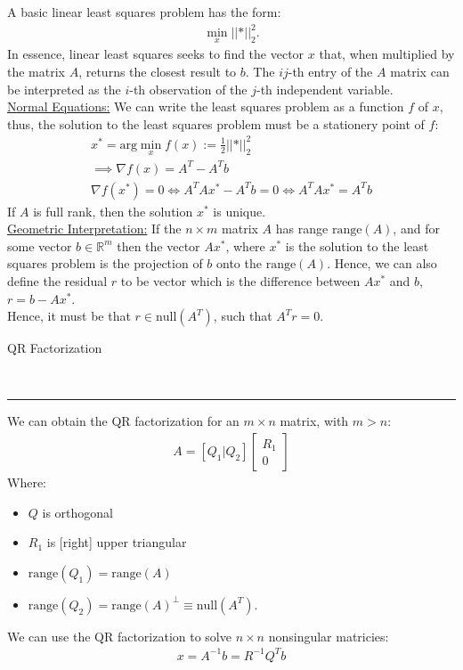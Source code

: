 \documentclass{article}
\newcommand{\header}[1]{\begin{large}\noindent #1\end{large}\\\rule{\textwidth}{0.5pt}}
\newcommand{\norm}[2]{\left\lvert\left\lvert#1\right\rvert\right\rvert}
\newcommand{\sheader}[1]{\underline{#1:}}
\newcommand{\gap}{\medskip\\}
\begin{document}
A basic linear least squares problem has the form:
\begin{align*}
    \min_x \norm*{Ax - b}^2_2.
\end{align*}
In essence, linear least squares seeks to find the vector $x$ that, when multiplied by 
the matrix $A$, returns the closest result to $b$. The $ij$-th entry of the $A$ matrix can be 
interpreted as the $i$-th observation of the $j$-th independent variable.
\gap
\sheader{Normal Equations}
We can write the least squares problem as a function $f$ of $x$, thus, the solution to the least 
squares problem must be a stationery point of $f$:
\begin{align*}
    x^* = \textrm{arg}\min_{x} f(x) := \frac{1}{2} \norm*{Ax-b}^2_2\\
    \implies \nabla f(x) = A^T - A^Tb\\
    \nabla f(x^*) = 0 \iff A^TAx^* - A^Tb = 0 \iff A^TAx^* = A^Tb
\end{align*}
If $A$ is full rank, then the solution $x^*$ is unique.
\gap
\sheader{Geometric Interpretation}
If the $n \times m$ matrix $A$ has range $\textrm{range}(A)$, and for some vector $b \in \mathbb{R}^m$
then the vector $Ax^*$, where $x^*$ is the solution to the least squares problem is the 
projection of $b$ onto the $\textrm{range}(A)$. Hence, we can also define the residual $r$ to be 
vector which is the difference between $Ax^*$ and $b$, $r = b - Ax^*$.\\
\smallskip
Hence, it must be that $r \in \textrm{null}(A^T)$, such that $A^Tr=0$.
\gap
\header{QR Factorization}
We can obtain the QR factorization for an $m \times n$ matrix, with $m > n$:
\begin{align*}
    A = [Q_1 | Q_2] \begin{bmatrix}
        R_1\\
        0
    \end{bmatrix}
\end{align*}
Where: 
\begin{itemize}
    \item $Q$ is orthogonal
    \item $R_1$ is [right] upper triangular
    \item $\textrm{range}(Q_1) = \textrm{range}(A)$
    \item $\textrm{range}(Q_2) = \textrm{range}(A)^\perp \equiv \textrm{null}(A^T)$.
\end{itemize}
We can use the QR factorization to solve $n \times n$ nonsingular matricies:
\begin{align*}
    x = A^{-1}b = R^{-1}Q^Tb
\end{align*}
\end{document}

